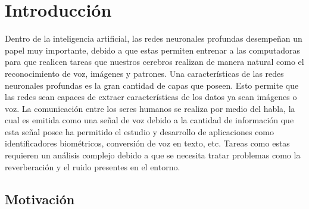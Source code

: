 \chapter{Introducción}
Dentro de la inteligencia artificial, las redes neuronales profundas desempeñan un papel muy importante, debido a que estas permiten entrenar a las computadoras para que realicen tareas que nuestros cerebros realizan de manera natural como el reconocimiento de voz, imágenes y patrones. Una características de las redes neuronales profundas es la gran cantidad de capas que poseen. Esto permite que las redes sean capaces de extraer características de los datos ya sean imágenes o voz. La comunicación entre los seres humanos se realiza por medio del habla, la cual es emitida como una señal de voz debido a la cantidad de información que esta señal posee ha permitido el estudio y desarrollo de aplicaciones como identificadores biométricos, conversión de voz en texto, etc. Tareas como estas requieren un análisis complejo debido a que se necesita tratar problemas como la reverberación y el ruido presentes en el entorno.




\section{Motivación}

